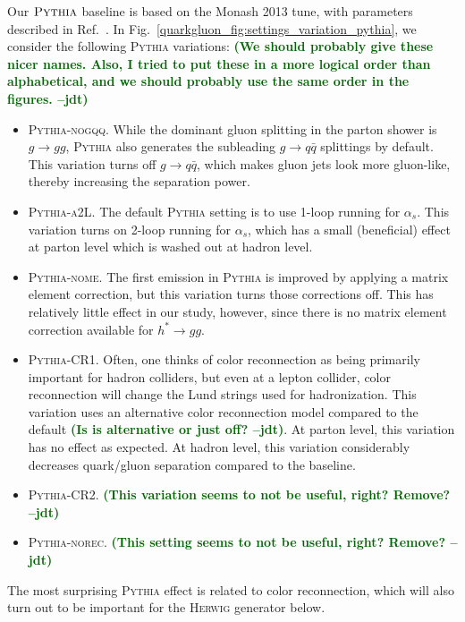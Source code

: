 \documentclass[11pt]{cernrep}
\newcommand{\jdt}[1]{\textbf{\textcolor{darkgreen}{(#1 --jdt)}}}
\begin{document}
Our $\textsc{Pythia}$ baseline is based on the Monash 2013 tune, with parameters described in Ref.~\cite{Skands:2014pea}.  In Fig.~\ref{quarkgluon_fig:settings_variation_pythia}, we consider the following \textsc{Pythia} variations:  \jdt{We should probably give these nicer names.  Also, I tried to put these in a more logical order than alphabetical, and we should probably use the same order in the figures.}
\begin{itemize}
\item \textsc{Pythia-nogqq}.  While the dominant gluon splitting in the parton shower is $g \to gg$, \textsc{Pythia} also generates the subleading $g \to q \bar{q}$ splittings by default.  This variation turns off $g \to q \bar{q}$, which makes gluon jets look more gluon-like, thereby increasing the separation power.
\item \textsc{Pythia-a2L}.  The default \textsc{Pythia} setting is to use 1-loop running for $\alpha_s$.  This variation turns on 2-loop running for $\alpha_s$, which has a small (beneficial) effect at parton level which is washed out at hadron level.
\item \textsc{Pythia-nome}.  The first emission in \textsc{Pythia} is improved by applying a matrix element correction, but this variation turns those corrections off.  This  has relatively little effect in our study, however, since there is no matrix element correction available for $h^* \to g g$.
\item \textsc{Pythia-CR1}.  Often, one thinks of color reconnection as being primarily important for hadron colliders, but even at a lepton collider, color reconnection will change the Lund strings used for hadronization.  This variation uses an alternative color reconnection model compared to the default \jdt{Is is alternative or just off?}.  At parton level, this variation has no effect as expected.  At hadron level, this variation considerably decreases quark/gluon separation compared to the baseline.
\item \textsc{Pythia-CR2}.  \jdt{This variation seems to not be useful, right?  Remove?}
\item \textsc{Pythia-norec}.  \jdt{This setting seems to not be useful, right? Remove?}
\end{itemize}
The most surprising \textsc{Pythia} effect is related to color reconnection, which will also turn out to be important for the \textsc{Herwig} generator below.
\end{document}
